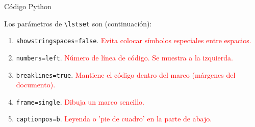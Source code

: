 \documentclass[aspectratio=169, 10pt]{beamer}
\begin{document}
\begin{frame}[fragile]{Código Python}

Los parámetros de \verb|\lstset| son (continuación):

    \begin{enumerate} \pause
        \item \verb|showstringspaces=false|. \textcolor{red}{Evita colocar símbolos especiales entre espacios.} \pause
        \item \verb|numbers=left|. \textcolor{red} {Número de línea de código. Se muestra a la izquierda.} \pause
        \item \verb|breaklines=true|. \textcolor{red}{Mantiene el código dentro del marco (márgenes del documento).} \pause
        \item \verb|frame=single|. \textcolor{red}{Dibuja un marco sencillo.} \pause
        \item \verb|captionpos=b|. \textcolor{red}{Leyenda o 'pie de cuadro' en la parte de abajo.}
    \end{enumerate}


\end{frame}
\end{document}
